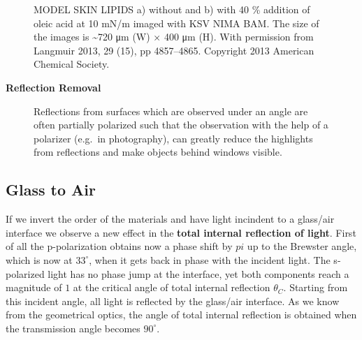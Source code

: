 \documentclass[
  a4paper,
]{book}
\begin{document}
\begin{tcolorbox}
\begin{figure}[H]
\begin{minipage}{0.50\linewidth}
{}

\subcaption{\label{fig-bam-example}}

\end{minipage}%

\caption{\label{fig-brewster-microscopy}MODEL SKIN LIPIDS a) without and
b) with 40 \% addition of oleic acid at 10 mN/m imaged with KSV NIMA
BAM. The size of the images is \textasciitilde720 μm (W) × 400 μm (H).
With permission from Langmuir 2013, 29 (15), pp 4857--4865. Copyright
2013 American Chemical Society.}

\end{figure}%

\end{tcolorbox}

\textbf{Reflection Removal}

\begin{figure}


\caption{\label{fig-brewster}Reflections from surfaces which are
observed under an angle are often partially polarized such that the
observation with the help of a polarizer (e.g.~in photography), can
greatly reduce the highlights from reflections and make objects behind
windows visible.}

\end{figure}%

\subsection{Glass to Air}\label{glass-to-air}

If we invert the order of the materials and have light incindent to a
glass/air interface we observe a new effect in the \textbf{total
internal reflection of light}. First of all the p-polarization obtains
now a phase shift by \(pi\) up to the Brewster angle, which is now at
\(33^{\circ}\), when it gets back in phase with the incident light. The
s-polarized light has no phase jump at the interface, yet both
components reach a magnitude of \(1\) at the critical angle of total
internal reflection \(\theta_C\). Starting from this incident angle, all
light is reflected by the glass/air interface. As we know from the
geometrical optics, the angle of total internal reflection is obtained
when the transmission angle becomes \(90^{\circ}\).
\end{document}
